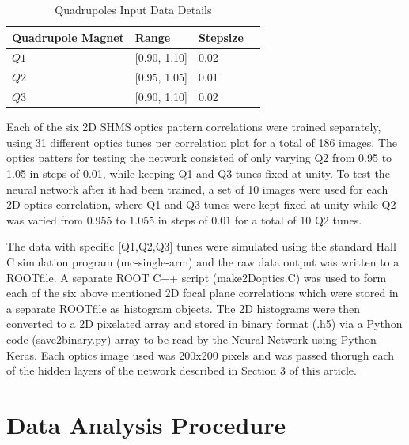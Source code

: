 \documentclass[conference]{IEEEtran}
\begin{document}
\begin{table}[h]
	\begin{center}
		\begin{tabular}{llll} %
                  \hline
                  Quadrupole Magnet & Range & Stepsize \\
                  \hline\hline
	          $Q1$ & [0.90, 1.10] & 0.02 \\
                  $Q2$ & [0.95, 1.05] & 0.01  \\
                  $Q3$ & [0.90, 1.10] & 0.02  \\                       
                  \hline 
		\end{tabular}
	\end{center}
	\caption{Quadrupoles Input Data Details}
	\label{tab:tune_stpSize}
\end{table}


Each of the six 2D SHMS optics pattern correlations were trained separately, using 31 different optics tunes
per correlation plot for a total of 186 images. The optics patters for testing the network consisted of only
varying Q2 from 0.95 to 1.05 in steps of 0.01, while keeping Q1 and Q3 tunes fixed at unity.
To test the neural network after it had been trained, a set of 10 images were used for each 2D optics correlation, where Q1 and Q3
tunes were kept fixed at unity while Q2 was varied from 0.955 to 1.055 in steps of 0.01 for a total of 10 Q2 tunes\cite{PC_CY_Aug2021}.

The data with specific [Q1,Q2,Q3] tunes were simulated using the standard Hall C simulation program (mc-single-arm)
and the raw data output was written to a ROOTfile. A separate ROOT C++ script (make2Doptics.C) was used to form each of
the six above mentioned 2D focal plane correlations which were stored in a separate ROOTfile as histogram objects.
The 2D histograms were then converted to a 2D pixelated array and stored in binary format (.h5) via a Python code (save2binary.py)
array to be read by the Neural Network using Python Keras. Each optics image used was 200x200 pixels and was passed thorugh each of
the hidden layers of the network described in Section 3 of this article.\\

\section{Data Analysis Procedure}
\end{document}
